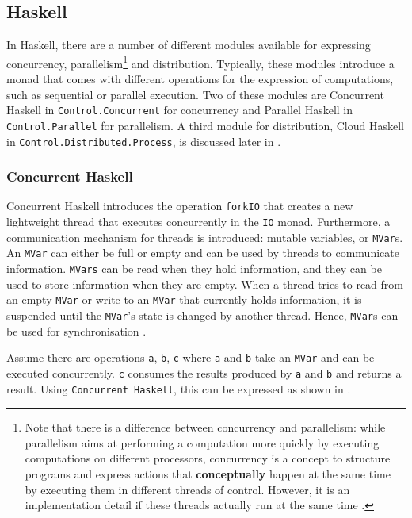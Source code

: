 \clearpage
\subsection{Haskell}
In \textsf{Haskell}, there are a number of different modules available for expressing concurrency, parallelism\footnote{Note that there is a difference between concurrency and parallelism: while parallelism aims at performing a computation more quickly by executing computations on different processors, concurrency is a concept to structure programs and express actions that \textbf{conceptually} happen at the same time by executing them in different threads of control. However, it is an implementation detail if these threads actually run at the same time \cite{Marlow}.} and distribution. Typically, these modules introduce a monad that comes with different operations for the expression of computations, such as sequential or parallel execution. Two of these modules are \textsf{Concurrent Haskell} in \texttt{Control.Concurrent} for concurrency and \textsf{Parallel Haskell} in \texttt{Control.Parallel} for parallelism. A third module for distribution, \textsf{Cloud Haskell} in \texttt{Control.Distributed.Process}, is discussed later in .

\subsubsection{Concurrent Haskell}
\textsf{Concurrent Haskell} introduces the operation \texttt{forkIO} that creates a new lightweight thread that executes concurrently in the \texttt{IO} monad. Furthermore, a communication mechanism for threads is introduced: mutable variables, or \texttt{MVar}s. An \texttt{MVar} can either be full or empty and can be used by threads to communicate information. \texttt{MVars} can be read when they hold information, and they can be used to store information when they are empty. When a thread tries to read from an empty \texttt{MVar} or write to an \texttt{MVar} that currently holds information, it is suspended until the \texttt{MVar}'s state is changed by another thread. Hence, \texttt{MVar}s can be used for synchronisation \cite{Marlow}.

Assume there are operations \texttt{a}, \texttt{b}, \texttt{c} where \texttt{a} and \texttt{b} take an \texttt{MVar} and can be executed concurrently. \texttt{c} consumes the results produced by \texttt{a} and \texttt{b} and returns a result. Using \texttt{Concurrent Haskell}, this can be expressed as shown in .

